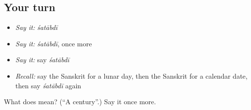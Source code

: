 \subsection*{Your turn}
\begin{itemize}
\raggedright
  \item \emph{Say it:} \emph{śatābdī}
  \item \emph{Say it:} \emph{śatābdī}, once more
  \item \emph{Say it:} say \emph{śatābdī}
  \item \emph{Recall:} say the Sanskrit for a lunar day, then the Sanskrit for a calendar date, then say \emph{śatābdī} again
\end{itemize}

\begin{tcolorbox}[breakable,colback=teal!4,colframe=teal!35!black,title={Before you move on}]
What does  mean? (\textquotedblleft{}A century\textquotedblright{}.) Say it once more.
\end{tcolorbox}
